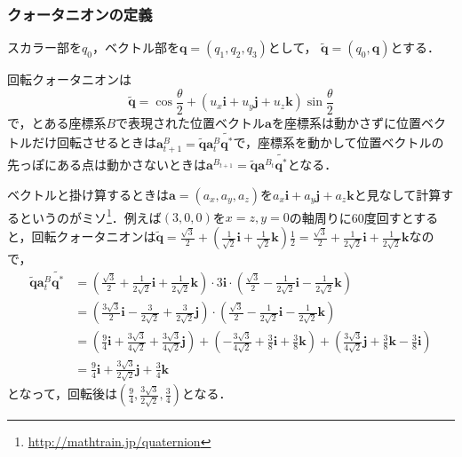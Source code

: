 \subsubsection{クォータニオンの定義}
スカラー部を$q_0$，ベクトル部を$\boldsymbol{q} = (q_1, q_2, q_3)$として，
$\tilde{\boldsymbol{q}} = (q_0, \boldsymbol{q})$とする．

回転クォータニオンは
\begin{equation}
  \tilde{\boldsymbol{q}} = \cos \frac{\theta}{2} + \left(u_x \boldsymbol{i} + u_y \boldsymbol{j} + u_z \boldsymbol{k}\right) \sin \frac{\theta}{2}
\end{equation}
で，とある座標系$B$で表現された位置ベクトル$\boldsymbol{a}$を座標系は動かさずに位置ベクトルだけ回転させるときは$\boldsymbol{a}^{B}_{t+1} = \tilde{\boldsymbol{q}} \boldsymbol{a}^{B}_{t} \tilde{\boldsymbol{q}^{\ast}}$で，座標系を動かして位置ベクトルの先っぽにある点は動かさないときは$\boldsymbol{a}^{B_{t+1}} = \tilde{\boldsymbol{q}} \boldsymbol{a}^{B_{t}} \tilde{\boldsymbol{q}^{\ast}}$となる．

ベクトルと掛け算するときは$\boldsymbol{a}=(a_x, a_y, a_z)$を$a_x \boldsymbol{i} + a_y \boldsymbol{j} + a_z \boldsymbol{k}$と見なして計算するというのがミソ\footnote{\url{http://mathtrain.jp/quaternion}}．例えば$(3,0,0)$を$x=z,y=0$の軸周りに60度回すとすると，回転クォータニオンは$\tilde{\boldsymbol{q}} = \frac{\sqrt{3}}{2} + \left(\frac{1}{\sqrt{2}} \boldsymbol{i} + \frac{1}{\sqrt{2}} \boldsymbol{k}\right) \frac{1}{2} = \frac{\sqrt{3}}{2} + \frac{1}{2\sqrt{2}} \boldsymbol{i} + \frac{1}{2\sqrt{2}} \boldsymbol{k}$なので，
{\tiny
  \begin{align}
    \tilde{\boldsymbol{q}} \boldsymbol{a}^{B}_{t} \tilde{\boldsymbol{q}^{\ast}} &= \left(\frac{\sqrt{3}}{2} + \frac{1}{2\sqrt{2}} \boldsymbol{i} + \frac{1}{2\sqrt{2}} \boldsymbol{k}\right) \cdot 3 \boldsymbol{i} \cdot \left(\frac{\sqrt{3}}{2} - \frac{1}{2\sqrt{2}} \boldsymbol{i} - \frac{1}{2\sqrt{2}} \boldsymbol{k}\right)\\
    &= \left(\frac{3\sqrt{3}}{2}\boldsymbol{i} - \frac{3}{2\sqrt{2}} + \frac{3}{2\sqrt{2}} \boldsymbol{j}\right) \cdot \left(\frac{\sqrt{3}}{2} - \frac{1}{2\sqrt{2}} \boldsymbol{i} - \frac{1}{2\sqrt{2}} \boldsymbol{k}\right)\\
    &= \left(\frac{9}{4}\boldsymbol{i} + \frac{3\sqrt{3}}{4\sqrt{2}} + \frac{3\sqrt{3}}{4\sqrt{2}} \boldsymbol{j}\right) +
    \left(-\frac{3\sqrt{3}}{4\sqrt{2}} + \frac{3}{8}\boldsymbol{i} + \frac{3}{8}\boldsymbol{k}\right) +
    \left(\frac{3\sqrt{3}}{4\sqrt{2}}\boldsymbol{j} + \frac{3}{8}\boldsymbol{k} - \frac{3}{8}\boldsymbol{i}\right)\\
    &= \frac{9}{4}\boldsymbol{i} + \frac{3\sqrt{3}}{2\sqrt{2}}\boldsymbol{j} + \frac{3}{4}\boldsymbol{k}
  \end{align}
}
となって，回転後は$(\frac{9}{4}, \frac{3\sqrt{3}}{2\sqrt{2}}, \frac{3}{4})$となる．

